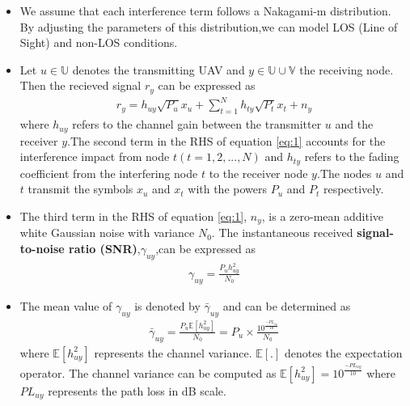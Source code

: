 \documentclass{beamer}
\begin{document}
\begin{frame}{}
 \begin{itemize}
     \item We assume that each interference term follows a Nakagami-m distribution. By adjusting the parameters of this distribution,we can model LOS (Line of Sight) and non-LOS conditions.
     \item Let $u \in \mathbb{U}$ denotes the transmitting UAV and $y \in \mathbb{U} \cup \mathbb{V}$ the receiving node. Then the recieved signal $r_{y}$ can be expressed as
     \begin{align}
         r_{y} = h_{uy}\sqrt{P_{u}}x_{u} + \sum_{t=1}^{N}h_{ty}\sqrt{P_{t}}x_{t} + n_{y}\label{eq:1}
     \end{align}
 where $h_{uy}$ refers to the channel gain between the transmitter $u$ and the receiver $y$.The second term in the RHS of equation \eqref{eq:1} accounts for the interference impact from node $t (t=1,2,...,N)$ and $h_{ty}$ refers to the fading coefficient from the interfering node $t$ to the receiver node $y$.The nodes $u$ and $t$ transmit the symbols $x_{u}$ and $x_{t}$ with the powers $P_{u}$ and $P_{t}$ respectively.
 \end{itemize}  
\end{frame}

\begin{frame}{}
   \begin{itemize}
       \item The third term in the RHS of equation \eqref{eq:1}, $n_{y}$, is a zero-mean additive white Gaussian noise with variance $N_{0}$. The instantaneous received \textbf{signal-to-noise ratio (SNR)},$\gamma_{uy}$,can be expressed as
       \begin{align}
         \gamma_{uy} = \frac{P_{u}h_{uy}^2}{N_{0}}\label{eq:2}
       \end{align}
       \item The mean value of $\gamma_{uy}$ is denoted by $\bar{\gamma}_{uy}$ and can be determined as
       \begin{align}
         \bar{\gamma}_{uy} =  \frac{P_{u}\mathbb{E}[h_{uy}^2]}{N_{0}} = P_{u} \times \frac{10^\frac{-PL_{uy}}{10}}{N_{0}}\label{eq:3}
       \end{align}
       where $\mathbb{E}[h_{uy}^2]$ represents the channel variance. $\mathbb{E}[.]$ denotes the expectation operator. The channel variance can be computed as $\mathbb{E}[h_{uy}^2] = 10^\frac{-PL_{uy}}{10}$ where $PL_{uy}$ represents the path loss in dB scale.
   \end{itemize} 
\end{frame}
\end{document}
